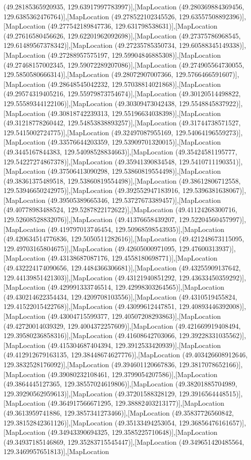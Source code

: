 (49.28185365920935, 129.63917997783997)],[MapLocation (49.280369884369456, 129.6385362476764)],[MapLocation (49.278522102345526, 129.63557508892396)],[MapLocation (49.277542189847736, 129.631798538631)],[MapLocation (49.27616580456626, 129.62201962092698)],[MapLocation (49.27375786968545, 129.61489567378342)],[MapLocation (49.27235785350734, 129.60588345149338)],[MapLocation (49.27288957575197, 129.59904846885308)],[MapLocation (49.27468157002345, 129.59072289207086)],[MapLocation (49.274905564730055, 129.5850580666314)],[MapLocation (49.28072907007366, 129.5766466591607)],[MapLocation (49.28648545042232, 129.57038814021868)],[MapLocation (49.29574319405216, 129.55979873754674)],[MapLocation (49.30120514498822, 129.55589344122106)],[MapLocation (49.30309473042438, 129.5548845837922)],[MapLocation (49.30818742239313, 129.55196634038398)],[MapLocation (49.31218778260442, 129.54853838893257)],[MapLocation (49.31744738571527, 129.5415002724775)],[MapLocation (49.32497087955169, 129.54064196559273)],[MapLocation (49.33576644203359, 129.53909701320015)],[MapLocation (49.3445167844383, 129.54098528834663)],[MapLocation (49.35424581195777, 129.54227274867378)],[MapLocation (49.35941390834548, 129.5410711190351)],[MapLocation (49.37506413090298, 129.53860819554498)],[MapLocation (49.38361375489518, 129.53860819554498)],[MapLocation (49.38612806712558, 129.53946650242975)],[MapLocation (49.392552947183916, 129.5396381638067)],[MapLocation (49.39505389665346, 129.53727673389457)],[MapLocation (49.40778983488524, 129.5287822172622)],[MapLocation (49.41124268300716, 129.52608528832076)],[MapLocation (49.41376658439207, 129.52204560457997)],[MapLocation (49.419797013746454, 129.50968598543935)],[MapLocation (49.420634514776836, 129.5050511282616)],[MapLocation (49.421248673115095, 129.49703165804675)],[MapLocation (49.42605000971095, 129.47600313937)],[MapLocation (49.43138687087176, 129.4558180698771)],[MapLocation (49.432224174090656, 129.4484366306681)],[MapLocation (49.43255909137642, 129.44139851421303)],[MapLocation (49.43121940851292, 129.43633450359292)],[MapLocation (49.429991333746514, 129.42998303264565)],[MapLocation (49.430214622354434, 129.4209708103556)],[MapLocation (49.4310519455824, 129.41522015422768)],[MapLocation (49.43099612447851, 129.40893446392008)],[MapLocation (49.43004715599377, 129.40507208293863)],[MapLocation (49.42720014039329, 129.4004372257609)],[MapLocation (49.421669919408494, 129.39580236858316)],[MapLocation (49.41608642703066, 129.39228331035562)],[MapLocation (49.415304687404394, 129.3912533420939)],[MapLocation (49.412912679163135, 129.38448674627776)],[MapLocation (49.403426608912646, 129.3832528176092)],[MapLocation (49.394601120667836, 129.3817078652166)],[MapLocation (49.39080232108461, 129.3799054207586)],[MapLocation (49.3864445127365, 129.38557024619806)],[MapLocation (49.38201885704989, 129.39290562959613)],[MapLocation (49.37201588328129, 129.3916564448515)],[MapLocation (49.364917566671295, 129.38882403213177)],[MapLocation (49.3613959741886, 129.3857341273466)],[MapLocation (49.35837726560842, 129.38152842361126)],[MapLocation (49.35133494253054, 129.36856476161657)],[MapLocation (49.34943390694325, 129.3585225710648)],[MapLocation (49.34937185146869, 129.35283715545447)],[MapLocation (49.349651420485564, 129.3469957651813)],[MapLocation 